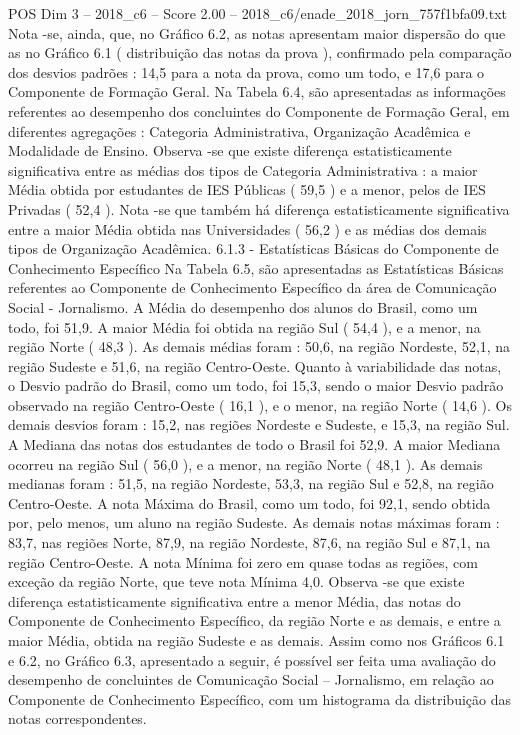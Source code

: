\begin{textsample}{POS Dim 3 – 2018\_c6 – Score 2.00 – 2018\_c6/enade\_2018\_jorn\_757f1bfa09.txt}
Nota -se, ainda, que, no Gráfico 6.2, as notas apresentam maior dispersão do que as no Gráfico 6.1 ( distribuição das notas da prova ), confirmado pela comparação dos desvios padrões : 14,5 para a nota da prova, como um todo, e 17,6 para o Componente de Formação Geral.
Na Tabela 6.4, são apresentadas as informações referentes ao desempenho dos concluintes do Componente de Formação Geral, em diferentes agregações : Categoria Administrativa, Organização Acadêmica e Modalidade de Ensino.
Observa -se que existe diferença estatisticamente significativa entre as médias dos tipos de Categoria Administrativa : a maior Média obtida por estudantes de IES Públicas ( 59,5 ) e a menor, pelos de IES Privadas ( 52,4 ).
Nota -se que também há diferença estatisticamente significativa entre a maior Média obtida nas Universidades ( 56,2 ) e as médias dos demais tipos de Organização Acadêmica. 6.1.3 - Estatísticas Básicas do Componente de Conhecimento Específico Na Tabela 6.5, são apresentadas as Estatísticas Básicas referentes ao Componente de Conhecimento Específico da área de Comunicação Social - Jornalismo.
A Média do desempenho dos alunos do Brasil, como um todo, foi 51,9.
A maior Média foi obtida na região Sul ( 54,4 ), e a menor, na região Norte ( 48,3 ).
As demais médias foram : 50,6, na região Nordeste, 52,1, na região Sudeste e 51,6, na região Centro-Oeste.
Quanto à variabilidade das notas, o Desvio padrão do Brasil, como um todo, foi 15,3, sendo o maior Desvio padrão observado na região Centro-Oeste ( 16,1 ), e o menor, na região Norte ( 14,6 ).
Os demais desvios foram : 15,2, nas regiões Nordeste e Sudeste, e 15,3, na região Sul.
A Mediana das notas dos estudantes de todo o Brasil foi 52,9.
A maior Mediana ocorreu na região Sul ( 56,0 ), e a menor, na região Norte ( 48,1 ).
As demais medianas foram : 51,5, na região Nordeste, 53,3, na região Sul e 52,8, na região Centro-Oeste.
A nota Máxima do Brasil, como um todo, foi 92,1, sendo obtida por, pelo menos, um aluno na região Sudeste.
As demais notas máximas foram : 83,7, nas regiões Norte, 87,9, na região Nordeste, 87,6, na região Sul e 87,1, na região Centro-Oeste.
A nota Mínima foi zero em quase todas as regiões, com exceção da região Norte, que teve nota Mínima 4,0.
Observa -se que existe diferença estatisticamente significativa entre a menor Média, das notas do Componente de Conhecimento Específico, da região Norte e as demais, e entre a maior Média, obtida na região Sudeste e as demais.
Assim como nos Gráficos 6.1 e 6.2, no Gráfico 6.3, apresentado a seguir, é possível ser feita uma avaliação do desempenho de concluintes de Comunicação Social – Jornalismo, em relação ao Componente de Conhecimento Específico, com um histograma da distribuição das notas correspondentes.

\end{textsample}
